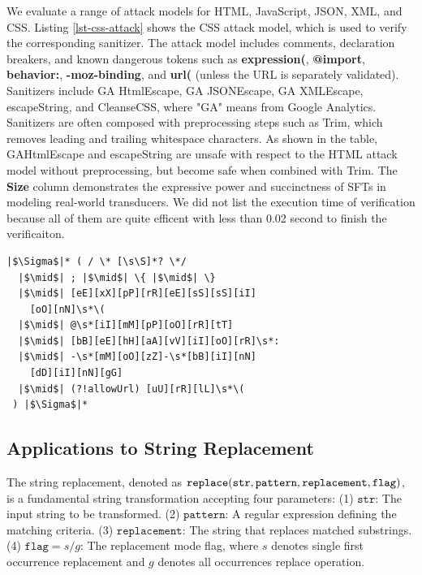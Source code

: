 We evaluate a range of attack models for HTML, JavaScript, JSON, XML, and CSS. Listing \ref{lst-css-attack} shows the CSS attack model, which is used to verify the corresponding sanitizer. The attack model includes comments, declaration breakers, and known dangerous tokens such as \textbf{expression(}, \textbf{@import}, \textbf{behavior:}, \textbf{-moz-binding}, and \textbf{url(} (unless the URL is separately validated). Sanitizers include GA HtmlEscape, GA JSONEscape, GA XMLEscape, escapeString, and CleanseCSS, where "GA" means from Google Analytics. Sanitizers are often composed with preprocessing steps such as Trim, which removes leading and trailing whitespace characters. As shown in the table, GAHtmlEscape and escapeString are unsafe with respect to the HTML attack model without preprocessing, but become safe when combined with Trim. The \textbf{Size} column demonstrates the expressive power and succinctness of SFTs in modeling real-world transducers. We did not list the execution time of verification because all of them are quite efficent with less than 0.02 second to finish the verificaiton.




\begin{lstlisting}[language={}, caption={CSS attack model for sanitizer verification.}, label={lst-css-attack}, float=htbp]
|$\Sigma$|* ( / \* [\s\S]*? \*/
  |$\mid$| ; |$\mid$| \{ |$\mid$| \}
  |$\mid$| [eE][xX][pP][rR][eE][sS][sS][iI]
    [oO][nN]\s*\(
  |$\mid$| @\s*[iI][mM][pP][oO][rR][tT]
  |$\mid$| [bB][eE][hH][aA][vV][iI][oO][rR]\s*:
  |$\mid$| -\s*[mM][oO][zZ]-\s*[bB][iI][nN]
    [dD][iI][nN][gG]
  |$\mid$| (?!allowUrl) [uU][rR][lL]\s*\(
 ) |$\Sigma$|*
\end{lstlisting}


\subsection{Applications to String Replacement}

The string replacement, denoted as
$\texttt{replace}(\texttt{str}, \texttt{pattern}, \newline\texttt{replacement}, \texttt{flag})$, is a fundamental string transformation accepting four parameters:
(1) $\texttt{str}$: The input string to be transformed.
(2) $\texttt{pattern}$: A regular expression defining the matching criteria.
(3) $\texttt{replacement}$: The string that replaces matched substrings.
(4) $\texttt{flag}=s/g$: The replacement mode flag, where $s$ denotes single first occurrence replacement and $g$ denotes all occurrences replace operation.

